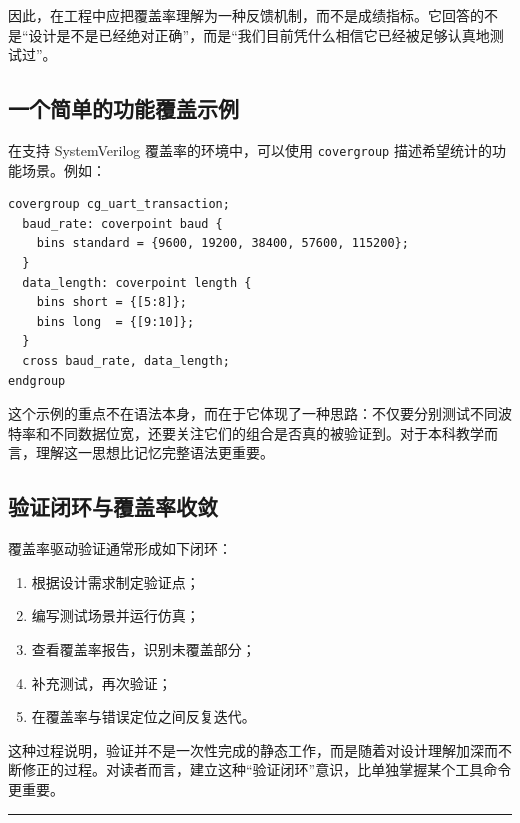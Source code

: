 因此，在工程中应把覆盖率理解为一种反馈机制，而不是成绩指标。它回答的不是``设计是不是已经绝对正确''，而是``我们目前凭什么相信它已经被足够认真地测试过''。

\subsection{一个简单的功能覆盖示例}\label{ux4e00ux4e2aux7b80ux5355ux7684ux529fux80fdux8986ux76d6ux793aux4f8b}

在支持 SystemVerilog 覆盖率的环境中，可以使用
\passthrough{\lstinline!covergroup!} 描述希望统计的功能场景。例如：

\begin{lstlisting}
covergroup cg_uart_transaction;
  baud_rate: coverpoint baud {
    bins standard = {9600, 19200, 38400, 57600, 115200};
  }
  data_length: coverpoint length {
    bins short = {[5:8]};
    bins long  = {[9:10]};
  }
  cross baud_rate, data_length;
endgroup
\end{lstlisting}

这个示例的重点不在语法本身，而在于它体现了一种思路：不仅要分别测试不同波特率和不同数据位宽，还要关注它们的组合是否真的被验证到。对于本科教学而言，理解这一思想比记忆完整语法更重要。

\subsection{验证闭环与覆盖率收敛}\label{ux9a8cux8bc1ux95edux73afux4e0eux8986ux76d6ux7387ux6536ux655b}

覆盖率驱动验证通常形成如下闭环：

\begin{enumerate}
\def\labelenumi{\arabic{enumi}.}
\tightlist
\item
  根据设计需求制定验证点；
\item
  编写测试场景并运行仿真；
\item
  查看覆盖率报告，识别未覆盖部分；
\item
  补充测试，再次验证；
\item
  在覆盖率与错误定位之间反复迭代。
\end{enumerate}

这种过程说明，验证并不是一次性完成的静态工作，而是随着对设计理解加深而不断修正的过程。对读者而言，建立这种``验证闭环''意识，比单独掌握某个工具命令更重要。

\begin{center}\rule{0.5\linewidth}{0.5pt}\end{center}

